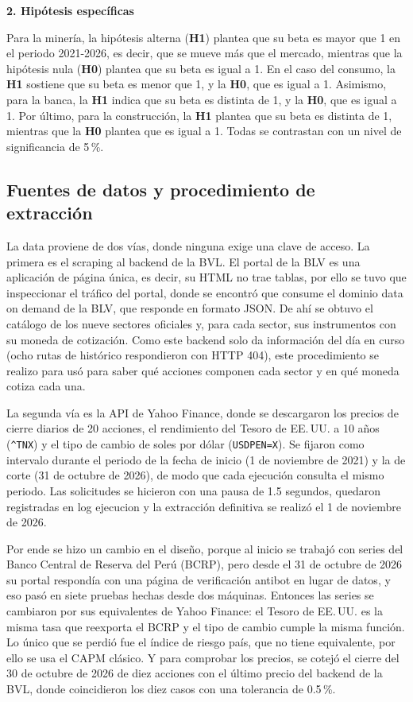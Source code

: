 \documentclass[jrfm,article,submit,oneauthor]{Definitions/mdpi}
\begin{document}
\noindent\textbf{2. Hipótesis específicas}

Para la minería, la hipótesis alterna (\textbf{H1}) plantea que su beta es mayor que 1 en el periodo 2021-2026, es decir, que se mueve más que el mercado, mientras que la hipótesis nula (\textbf{H0}) plantea que su beta es igual a 1. En el caso del consumo, la \textbf{H1} sostiene que su beta es menor que 1, y la \textbf{H0}, que es igual a 1. Asimismo, para la banca, la \textbf{H1} indica que su beta es distinta de 1, y la \textbf{H0}, que es igual a 1. Por último, para la construcción, la \textbf{H1} plantea que su beta es distinta de 1, mientras que la \textbf{H0} plantea que es igual a 1. Todas se contrastan con un nivel de significancia de 5\,\%.

\subsection{Fuentes de datos y procedimiento de extracción}
La data proviene de dos vías, donde ninguna exige una clave de acceso. La primera es el scraping al backend de la BVL. El portal de la BLV es una aplicación de página única, es decir, su HTML no trae tablas, por ello se tuvo que inspeccionar el tráfico del portal, donde se encontró que consume el dominio data on demand de la BLV, que responde en formato JSON. De ahí se obtuvo el catálogo de los nueve sectores oficiales y, para cada sector, sus instrumentos con su moneda de cotización. Como este backend solo da información del día en curso (ocho rutas de histórico respondieron con HTTP 404), este procedimiento se realizo para usó para saber qué acciones componen cada sector y en qué moneda cotiza cada una.

La segunda vía es la API de Yahoo Finance, donde se descargaron los precios de cierre diarios de 20 acciones, el rendimiento del Tesoro de EE.\,UU. a 10 años (\texttt{\^{}TNX}) y el tipo de cambio de soles por dólar (\texttt{USDPEN=X}). Se fijaron como intervalo durante el periodo de la fecha de inicio (1 de noviembre de 2021) y la de corte (31 de octubre de 2026), de modo que cada ejecución consulta el mismo periodo. Las solicitudes se hicieron con una pausa de 1.5 segundos, quedaron registradas en log ejecucion y la extracción definitiva se realizó el 1 de noviembre de 2026.

Por ende se hizo un cambio en el diseño, porque al inicio se trabajó con series del Banco Central de Reserva del Perú (BCRP), pero desde el 31 de octubre de 2026 su portal respondía con una página de verificación antibot en lugar de datos, y eso pasó en siete pruebas hechas desde dos máquinas. Entonces las series se cambiaron por sus equivalentes de Yahoo Finance: el Tesoro de EE.\,UU. es la misma tasa que reexporta el BCRP y el tipo de cambio cumple la misma función. Lo único que se perdió fue el índice de riesgo país, que no tiene equivalente, por ello se usa el CAPM clásico. Y para comprobar los precios, se cotejó el cierre del 30 de octubre de 2026 de diez acciones con el último precio del backend de la BVL, donde coincidieron los diez casos con una tolerancia de 0.5\,\%.
\end{document}
